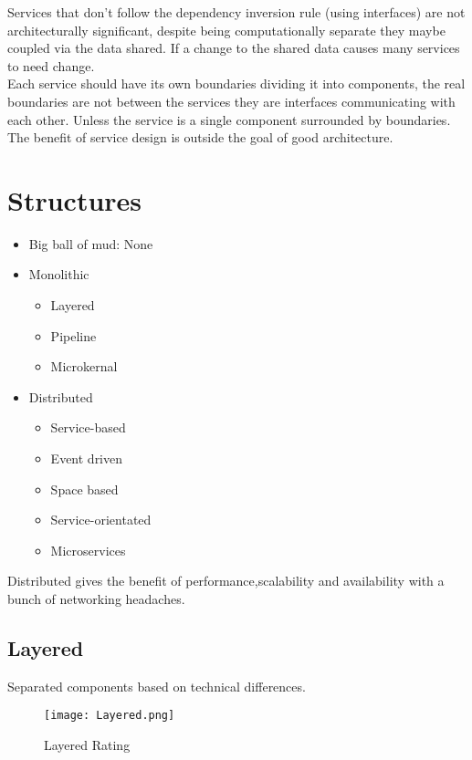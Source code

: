\documentclass[11pt]{scrartcl} %
\begin{document}
Services that don't follow the dependency inversion rule (using interfaces) are not architecturally significant,
despite being computationally separate they maybe coupled via the data shared. If a change to the shared data
causes many services to need change.\\

Each service should have its own boundaries dividing it into components, the real boundaries are not between the
services they are interfaces communicating with each other. Unless the service is a single component surrounded by boundaries.\\

The benefit of service design is outside the goal of good architecture.

\section{Structures}

\begin{itemize}
  \item Big ball of mud: None
  \item Monolithic
  \begin{itemize}
    \item Layered
    \item Pipeline
    \item Microkernal
  \end{itemize}
  \item Distributed
  \begin{itemize}
    \item Service-based
    \item Event driven
    \item Space based
    \item Service-orientated
    \item Microservices
  \end{itemize}
\end{itemize}

Distributed gives the benefit of performance,scalability and availability with a bunch of networking headaches.

\subsection{Layered}

Separated components based on technical differences.\\

\begin{figure}[h] %
	\centering
	\texttt{[image: Layered.png]} %
	\caption{Layered Rating}
  \label{Layered}
\end{figure}
\end{document}
